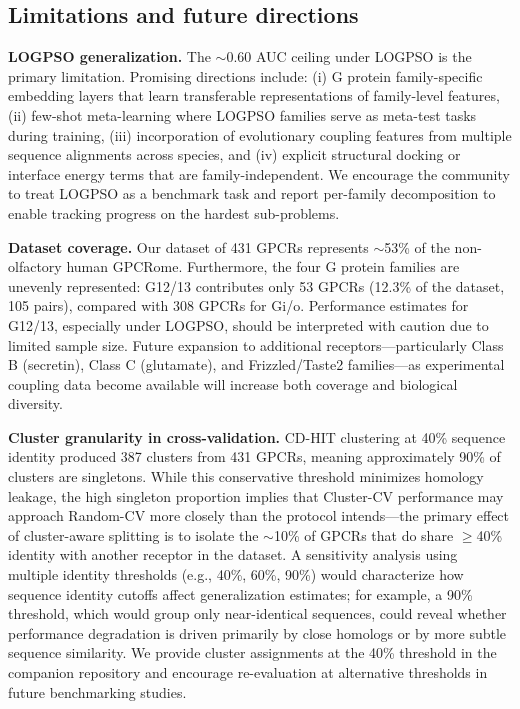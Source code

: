 \documentclass[11pt,a4paper]{article}
\begin{document}
\subsection{Limitations and future directions}

\textbf{LOGPSO generalization.} The $\sim$0.60 AUC ceiling under LOGPSO is the primary limitation. Promising directions include: (i) G protein family-specific embedding layers that learn transferable representations of family-level features, (ii) few-shot meta-learning where LOGPSO families serve as meta-test tasks during training, (iii) incorporation of evolutionary coupling features from multiple sequence alignments across species, and (iv) explicit structural docking or interface energy terms that are family-independent. We encourage the community to treat LOGPSO as a benchmark task and report per-family decomposition to enable tracking progress on the hardest sub-problems.

\textbf{Dataset coverage.} Our dataset of 431 GPCRs represents $\sim$53\% of the non-olfactory human GPCRome. Furthermore, the four G protein families are unevenly represented: G12/13 contributes only 53 GPCRs (12.3\% of the dataset, 105 pairs), compared with 308 GPCRs for Gi/o. Performance estimates for G12/13, especially under LOGPSO, should be interpreted with caution due to limited sample size. Future expansion to additional receptors---particularly Class B (secretin), Class C (glutamate), and Frizzled/Taste2 families---as experimental coupling data become available will increase both coverage and biological diversity.

\textbf{Cluster granularity in cross-validation.} CD-HIT clustering at 40\% sequence identity produced 387 clusters from 431 GPCRs, meaning approximately 90\% of clusters are singletons. While this conservative threshold minimizes homology leakage, the high singleton proportion implies that Cluster-CV performance may approach Random-CV more closely than the protocol intends---the primary effect of cluster-aware splitting is to isolate the $\sim$10\% of GPCRs that do share $\ge$40\% identity with another receptor in the dataset. A sensitivity analysis using multiple identity thresholds (e.g., 40\%, 60\%, 90\%) would characterize how sequence identity cutoffs affect generalization estimates; for example, a 90\% threshold, which would group only near-identical sequences, could reveal whether performance degradation is driven primarily by close homologs or by more subtle sequence similarity. We provide cluster assignments at the 40\% threshold in the companion repository and encourage re-evaluation at alternative thresholds in future benchmarking studies.
\end{document}

